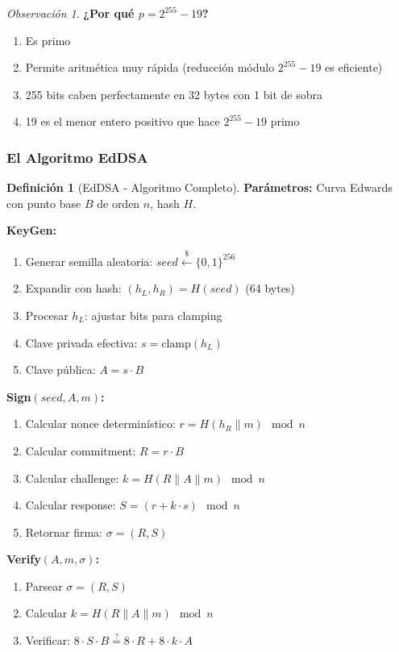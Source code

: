 \documentclass[11pt,a4paper,twoside,openright]{book}
\theoremstyle{definition}
\newtheorem{definition}{Definición}[chapter]
\theoremstyle{plain}
\theoremstyle{remark}
\newtheorem{remark}{Observación}[chapter]
\begin{document}
\begin{remark}
\textbf{¿Por qué $p = 2^{255} - 19$?}

\begin{enumerate}
    \item Es primo
    \item Permite aritmética muy rápida (reducción módulo $2^{255} - 19$ es eficiente)
    \item 255 bits caben perfectamente en 32 bytes con 1 bit de sobra
    \item 19 es el menor entero positivo que hace $2^{255} - 19$ primo
\end{enumerate}
\end{remark}

\subsubsection{El Algoritmo EdDSA}

\begin{definition}[EdDSA - Algoritmo Completo]
\textbf{Parámetros:} Curva Edwards con punto base $B$ de orden $n$, hash $H$.

\textbf{KeyGen:}
\begin{enumerate}
    \item Generar semilla aleatoria: $seed \xleftarrow{\$} \{0,1\}^{256}$
    \item Expandir con hash: $(h_L, h_R) = H(seed)$ (64 bytes)
    \item Procesar $h_L$: ajustar bits para clamping
    \item Clave privada efectiva: $s = \text{clamp}(h_L)$
    \item Clave pública: $A = s \cdot B$
\end{enumerate}

\textbf{Sign$(seed, A, m)$:}
\begin{enumerate}
    \item Calcular nonce determinístico: $r = H(h_R \| m) \mod n$
    \item Calcular commitment: $R = r \cdot B$
    \item Calcular challenge: $k = H(R \| A \| m) \mod n$
    \item Calcular response: $S = (r + k \cdot s) \mod n$
    \item Retornar firma: $\sigma = (R, S)$
\end{enumerate}

\textbf{Verify$(A, m, \sigma)$:}
\begin{enumerate}
    \item Parsear $\sigma = (R, S)$
    \item Calcular $k = H(R \| A \| m) \mod n$
    \item Verificar: $8 \cdot S \cdot B \stackrel{?}{=} 8 \cdot R + 8 \cdot k \cdot A$
\end{enumerate}
\end{definition}
\end{document}
